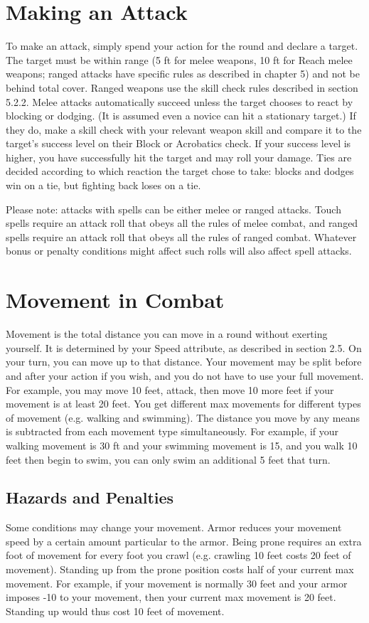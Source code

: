 \section{Making an Attack}

To make an attack, simply spend your action for the round and declare a target. The target must be within range (5 ft for melee weapons, 10 ft for Reach melee weapons; ranged attacks have specific rules as described in chapter 5) and not be behind total cover. Ranged weapons use the skill check rules described in section 5.2.2. Melee attacks automatically succeed unless the target chooses to react by blocking or dodging. (It is assumed even a novice can hit a stationary target.) If they do, make a skill check with your relevant weapon skill and compare it to the target's success level on their Block or Acrobatics check. If your success level is higher, you have successfully hit the target and may roll your damage. Ties are decided according to which reaction the target chose to take: blocks and dodges win on a tie, but fighting back loses on a tie.

Please note: attacks with spells can be either melee or ranged attacks. Touch spells require an attack roll that obeys all the rules of melee combat, and ranged spells require an attack roll that obeys all the rules of ranged combat. Whatever bonus or penalty conditions might affect such rolls will also affect spell attacks.

\section{Movement in Combat}

Movement is the total distance you can move in a round without exerting yourself. It is determined by your Speed attribute, as described in section 2.5. On your turn, you can move up to that distance. Your movement may be split before and after your action if you wish, and you do not have to use your full movement. For example, you may move 10 feet, attack, then move 10 more feet if your movement is at least 20 feet. You get different max movements for different types of movement (e.g. walking and swimming). The distance you move by any means is subtracted from each movement type simultaneously. For example, if your walking movement is 30 ft and your swimming movement is 15, and you walk 10 feet then begin to swim, you can only swim an additional 5 feet that turn.

\subsection{Hazards and Penalties}
Some conditions may change your movement. Armor reduces your movement speed by a certain amount particular to the armor. Being prone requires an extra foot of movement for every foot you crawl (e.g. crawling 10 feet costs 20 feet of movement). Standing up from the prone position costs half of your current max movement. For example, if your movement is normally 30 feet and your armor imposes -10 to your movement, then your current max movement is 20 feet. Standing up would thus cost 10 feet of movement.

